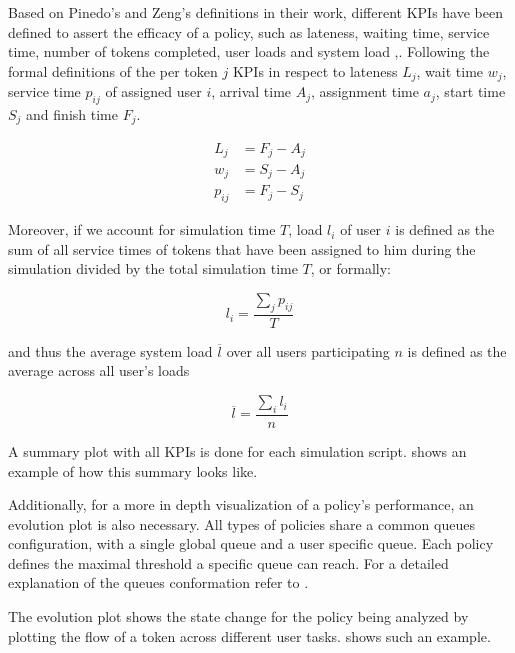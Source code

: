 \documentclass{seal_thesis}
\begin{document}
Based on Pinedo's and Zeng's definitions in their work, different KPIs have been defined to assert the efficacy of a policy, such as lateness, waiting time, service time, number of tokens completed, user loads and system load \cite{Pinedo2008},\cite{Zeng2005}. Following the formal definitions of the per token $j$ KPIs in respect to lateness $L_j$, wait time $w_j$, service time $p_{ij}$ of assigned user $i$, arrival time $A_j$, assignment time $a_j$, start time $S_j$ and finish time $F_j$.

\begin{align}
	L_j&=F_j-A_j \label{eq:lateness}\\
	w_j&=S_j-A_j \\
	p_{ij}&=F_j-S_j
\end{align}

Moreover, if we account for simulation time $T$, load $l_i$ of user $i$ is defined as the sum of all service times of tokens that have been assigned to him during the simulation divided by the total simulation time $T$, or formally:

\begin{equation}
	l_i=\frac{\sum_j p_{ij}}{T}
\end{equation}

and thus the average system load $\overline{l}$ over all users participating $n$ is defined as the average across all user's loads \ie

\begin{equation}
	\overline{l} = \frac{\sum_i l_i}{n}
\end{equation}

A summary plot with all KPIs is done for each simulation script.  shows an example of how this summary looks like.


Additionally, for a more in depth visualization of a policy's performance, an evolution plot is also necessary. All types of policies share a common queues configuration, with a single global queue and a user specific queue. Each policy defines the maximal threshold a specific queue can reach. For a detailed explanation of the queues conformation refer to .

The evolution plot shows the state change for the policy being analyzed by plotting the flow of a token across different user tasks.  shows such an example.
\end{document}
